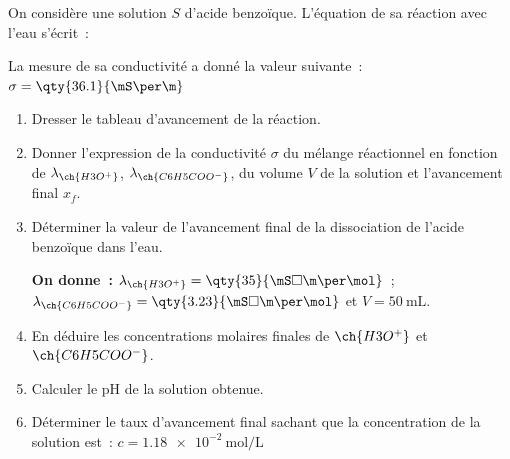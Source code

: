 On considère une solution $S$ d'acide benzoïque. L'équation de sa réaction avec
l'eau s'écrit~:
    
\hspace{5cm}

La mesure de sa conductivité a donné la valeur suivante~:
$\sigma=\qty{36.1}{\mS\per\m}$
\begin{enumerate}
    \item Dresser le tableau d'avancement de la réaction.
    \item Donner l'expression de la conductivité $\sigma$ du mélange réactionnel
          en fonction de $\lambda_{\ch{H3O^{+}}}$, $\lambda_{\ch{C6H5COO^{-}}}$,
          du volume $V$ de la solution et l'avancement final $x_{f}$.
    \item Déterminer la valeur de l'avancement final de la dissociation de
          l'acide benzoïque dans l'eau.

          \textbf{On donne~:}
          $\lambda_{\ch{H3O^{+}}}=\qty{35}{\mS\square\m\per\mol}$~;
          $\lambda_{\ch{C6H5COO^{-}}}=\qty{3.23}{\mS\square\m\per\mol}$ et
          $V=\qty{50}{\mL}$.
    \item En déduire les concentrations molaires finales de $\ch{H3O^{+}}$ et
          $\ch{C6H5COO^{-}}$.
    \item Calculer le pH de la solution obtenue.
    \item Déterminer le taux d'avancement final sachant que la concentration de
          la solution est~: $c=\qty{1.18e-2}{\mol\per\L}$
\end{enumerate}
